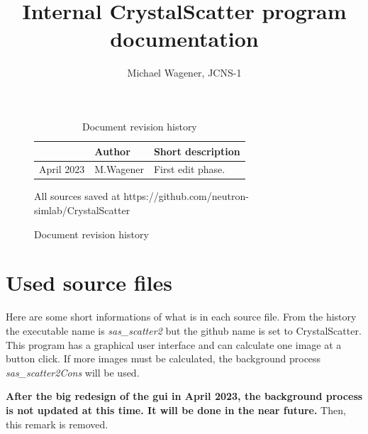 \documentclass[11pt]{article} %
\author{Michael Wagener, JCNS-1}
\title{Internal CrystalScatter program documentation}
\begin{document}
\maketitle
\tableofcontents %

\begin{figure}[b] %
\begin{longtable}{|p{2.7cm}|p{2.6cm}|p{10.3cm}|}
\caption{Document revision history} \\
\hline\rowcolor{rowcolor}{\bf Date} & {\bf Author} & {\bf Short description} \\
\endfirsthead
\hline
April 2023 & M.Wagener & First edit phase. \\ \hline
\end{longtable}

\centerline{All sources saved at https://github.com/neutron-simlab/CrystalScatter}
\end{figure}

\clearpage %


\section{Used source files}

Here are some short informations of what is in each source file. From the history the executable name is {\it sas\_scatter2} but the github name is set to CrystalScatter. This program has a graphical user interface and can calculate one image at a button click. If more images must be calculated, the background process {\it sas\_scatter2Cons} will be used.

{\bf After the big redesign of the gui in April 2023, the background process is not updated at this time. It will be done in the near future.} Then, this remark is removed.
\end{document}
